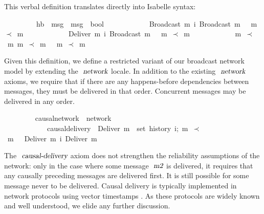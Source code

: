 This verbal definition translates directly into Isabelle syntax:
\vspace{0.25em}
\begin{isabellebody}
\ \ \ \ \ \ \ \ \ hb\ {\isacharcolon}{\isacharcolon}\ {\isachardoublequoteopen}{\isacharprime}msg\ {\isasymRightarrow}\ {\isacharprime}msg\ {\isasymRightarrow}\ bool{\isachardoublequoteclose}\ \isanewline
\ \ \ \ \ \ \ \ \ \ {\isachardoublequoteopen}{\isasymlbrakk}\ Broadcast\ m{}\ {\isasymsqsubset}\isactrlsup i\ Broadcast\ m{}\ {\isasymrbrakk}\ {\isasymLongrightarrow}\ m{}\ $\prec$\ m{}{\isachardoublequoteclose}\ {\isacharbar}\isanewline
\ \ \ \ \ \ \ \ \ \ {\isachardoublequoteopen}{\isasymlbrakk}\ Deliver\ m{}\ {\isasymsqsubset}\isactrlsup i\ Broadcast\ m{}\ {\isasymrbrakk}\ {\isasymLongrightarrow}\ m{}\ $\prec$\ m{}{\isachardoublequoteclose}\ {\isacharbar}\isanewline
\ \ \ \ \ \ \ \ \ \ {\isachardoublequoteopen}{\isasymlbrakk}\ m{}\ $\prec$\  m{}{\isacharsemicolon}\ m{}\ $\prec$\ m{}\ {\isasymrbrakk}\ {\isasymLongrightarrow}\ m{}\ $\prec$\ m{}{\isachardoublequoteclose}
\end{isabellebody}
\vspace{0.25em}
Given this definition, we define a restricted variant of our broadcast network model by extending the $\isa{network}$ locale.
In addition to the existing $\isa{network}$ axioms, we require that if there are any happens-before dependencies between messages, they must be delivered in that order.
Concurrent messages may be delivered in any order.
\vspace{0.25em}
\begin{isabellebody}
\ \ \ \ \ \ \ \  causal{\isacharunderscore}network\ {\isacharequal}\ network\ {\isacharplus}\isanewline
\ \ \ \ \ \ \ \ \ \ \ \ causal{\isacharunderscore}delivery{\isacharcolon}\ {\isasymlbrakk}\ {\isachardoublequoteopen}Deliver\ m{}\ {\isasymin}\ set\ {\isacharparenleft}history\ i{\isacharparenright};\ m{}\ $\prec$\ m{}\ {\isasymrbrakk}\ {\isasymLongrightarrow}\ Deliver\ m{}\ {\isasymsqsubset}\isactrlsup i\ Deliver\ m{}{\isachardoublequoteclose}
\end{isabellebody}
\vspace{0.25em}
The $\isa{causal-delivery}$ axiom does not strengthen the reliability assumptions of the network: only in the case where some message $\isa{m2}$ is delivered, it requires that any causally preceding messages are delivered first.
It is still possible for some message never to be delivered.
Causal delivery is typically implemented in network protocols using vector timestamps \cite{Schwarz:1994gl,Fidge:1988tv,Raynal:1996jl}.
As these protocols are widely known and well understood, we elide any further discussion.

